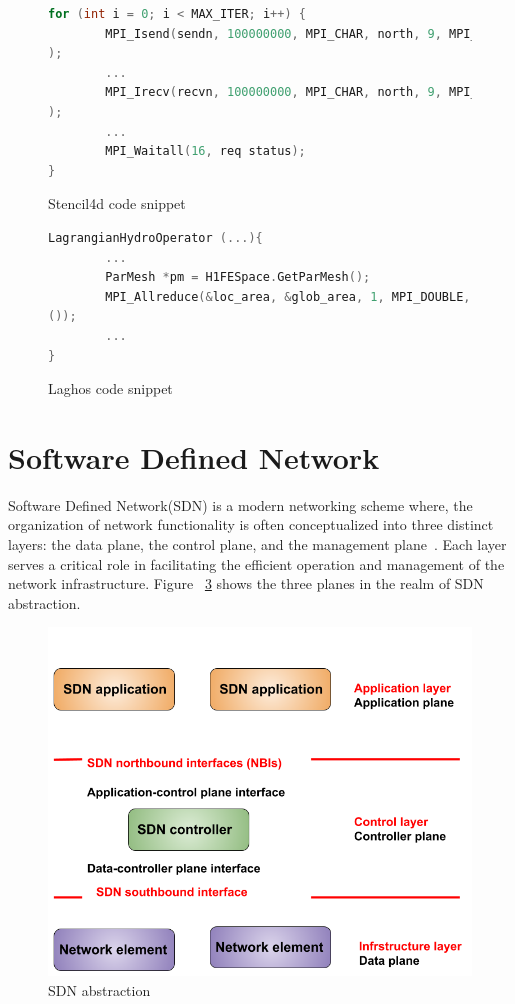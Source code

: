 \begin{figure}[H]
\begin{lstlisting}[breaklines, language=C++, frame=single, tabsize=4, basicstyle=\ttfamily]
for (int i = 0; i < MAX_ITER; i++) {
        MPI_Isend(sendn, 100000000, MPI_CHAR, north, 9, MPI_COMM_WORLD, &reqs[0]
);
        ...
        MPI_Irecv(recvn, 100000000, MPI_CHAR, north, 9, MPI_COMM_WORLD, &reqs[8]
);
        ...
        MPI_Waitall(16, req status);
}
\end{lstlisting}
\caption{Stencil4d code snippet}
\label{code.stencil}
\end{figure}

\begin{figure}[H]
\begin{lstlisting}[breaklines, language=C++, frame=single, tabsize=4, basicstyle=\ttfamily]
LagrangianHydroOperator (...){
        ...
        ParMesh *pm = H1FESpace.GetParMesh();
        MPI_Allreduce(&loc_area, &glob_area, 1, MPI_DOUBLE, MPI_SUM, pm->GetComm
());
        ...
}
\end{lstlisting}
\caption{Laghos code snippet}
\label{code.laghos}
\end{figure}

\section{Software Defined Network}
Software Defined Network(SDN) is a modern networking scheme where, the organization of network functionality is often conceptualized into three distinct layers: the data plane, the control plane, and the management plane~\cite{kreutz2014software}. Each layer serves a critical role in facilitating the efficient operation and management of the network infrastructure. Figure ~\ref{fig:sdn_abs} shows the three planes in the realm of SDN abstraction.

\begin{figure}[h!]
  \centering
  \includegraphics[width=0.8\columnwidth]{figs/sdn_abstraction.png}
  \caption{SDN abstraction }
  \label{fig:sdn_abs}
\end{figure}


